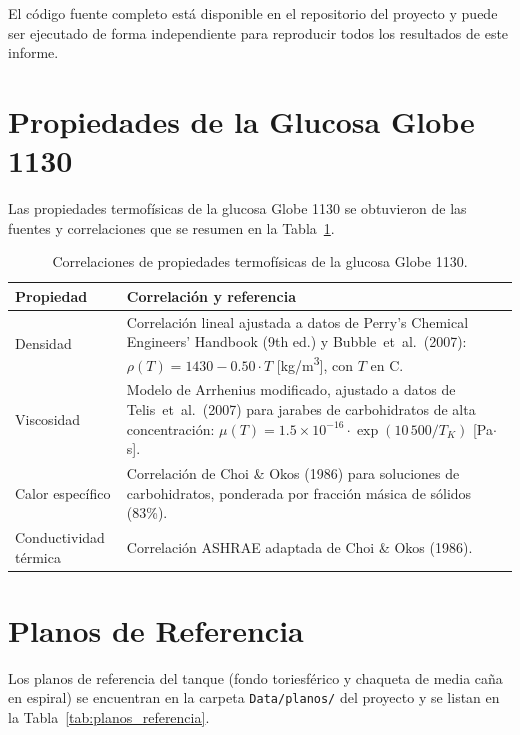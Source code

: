 El c\'odigo fuente completo est\'a disponible en el repositorio del proyecto y puede ser ejecutado de forma independiente para reproducir todos los resultados de este informe.

\section{Propiedades de la Glucosa Globe 1130}
\label{appendix:propiedades}

Las propiedades termof\'isicas de la glucosa Globe 1130 se obtuvieron de las fuentes y correlaciones que se resumen en la Tabla~\ref{tab:propiedades_glucosa}.

\begin{table}[H]
	\centering
	\caption{Correlaciones de propiedades termof\'isicas de la glucosa Globe 1130.}
	\label{tab:propiedades_glucosa}
	\begin{tabularx}{\textwidth}{@{}lX@{}}
		\toprule
		\textbf{Propiedad} & \textbf{Correlaci\'on y referencia} \\
		\midrule
		Densidad & Correlaci\'on lineal ajustada a datos de Perry's Chemical Engineers' Handbook (9th ed.) y Bubble~et~al.~(2007): $\rho(T) = 1430 - 0.50 \cdot T$ [kg/m\textsuperscript{3}], con $T$ en \textdegree C. \\
		Viscosidad & Modelo de Arrhenius modificado, ajustado a datos de Telis~et~al.~(2007) para jarabes de carbohidratos de alta concentraci\'on: $\mu(T) = 1.5 \times 10^{-16} \cdot \exp(10\,500 / T_K)$ [Pa$\cdot$s]. \\
		Calor espec\'ifico & Correlaci\'on de Choi \& Okos (1986) para soluciones de carbohidratos, ponderada por fracci\'on m\'asica de s\'olidos (83\%). \\
		Conductividad t\'ermica & Correlaci\'on ASHRAE adaptada de Choi \& Okos (1986). \\
		\bottomrule
	\end{tabularx}
\end{table}

\section{Planos de Referencia}
\label{appendix:planos}

Los planos de referencia del tanque (fondo toriesf\'erico y chaqueta de media ca\~na en espiral) se encuentran en la carpeta \texttt{Data/planos/} del proyecto y se listan en la Tabla~\ref{tab:planos_referencia}.

